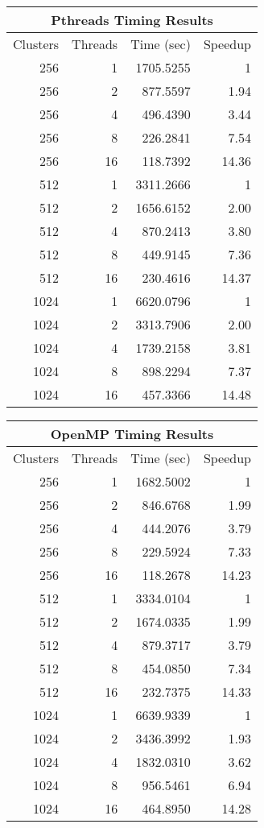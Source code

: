 \documentclass[a4paper]{article}
\begin{document}
\begin{center}
  \begin{tabular}{| r r r r |}
    \hline
    \multicolumn{4}{|c|}{Pthreads Timing Results} \\
    \hline
    Clusters & Threads & Time (sec) & Speedup \\
    \hline
    256 & 1 & 1705.5255 & 1 \\
    256 & 2 & 877.5597 & 1.94 \\
    256 & 4 & 496.4390 & 3.44 \\
    256 & 8 & 226.2841 & 7.54 \\
    256 & 16 & 118.7392 & 14.36 \\
    \hline
    512 & 1 & 3311.2666 & 1 \\
    512 & 2 & 1656.6152 & 2.00 \\
    512 & 4 & 870.2413 & 3.80 \\
    512 & 8 & 449.9145 & 7.36 \\
    512 & 16 & 230.4616 & 14.37 \\
    \hline
    1024 & 1 & 6620.0796 & 1 \\
    1024 & 2 & 3313.7906 & 2.00 \\
    1024 & 4 & 1739.2158 & 3.81 \\
    1024 & 8 & 898.2294 & 7.37 \\
    1024 & 16 & 457.3366 & 14.48 \\
    \hline
  \end{tabular}
\end{center}

\begin{center}
  \begin{tabular}{| r r r r |}
    \hline
    \multicolumn{4}{|c|}{OpenMP Timing Results} \\
    \hline
    Clusters & Threads & Time (sec) & Speedup\\
    \hline
    256 & 1 & 1682.5002 & 1\\
    256 & 2 & 846.6768 & 1.99 \\
    256 & 4 & 444.2076 & 3.79 \\
    256 & 8 & 229.5924 & 7.33 \\
    256 & 16 & 118.2678 & 14.23 \\
    \hline
    512 & 1 & 3334.0104 & 1 \\
    512 & 2 & 1674.0335 & 1.99 \\
    512 & 4 & 879.3717 & 3.79 \\
    512 & 8 & 454.0850 & 7.34 \\
    512 & 16 & 232.7375 & 14.33 \\
    \hline
    1024 & 1 & 6639.9339 & 1 \\
    1024 & 2 & 3436.3992 & 1.93 \\
    1024 & 4 & 1832.0310 & 3.62 \\
    1024 & 8 & 956.5461 & 6.94 \\
    1024 & 16 & 464.8950 & 14.28 \\
    \hline
  \end{tabular}
\end{center}
\end{document}
